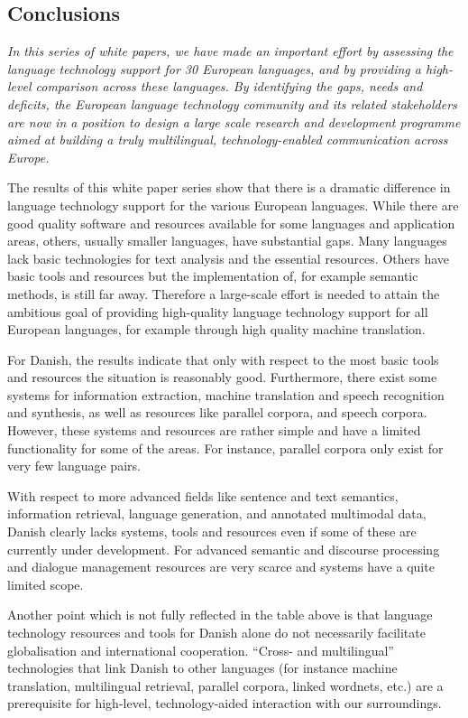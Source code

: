 \documentclass[]{../../metanetpaper}
\begin{document}
\begin{multicols}{2}
\subsection{Conclusions}

\emph{In this series of white papers, we have made an important effort by assessing the language technology support for 30 European languages, and by providing a high-level comparison across these languages. By identifying the gaps, needs and deficits, the European language technology community and its related stakeholders are now in a position to design a large scale research and development programme aimed at building a truly multilingual, technology-enabled communication across Europe.}

The results of this white paper series show that there is a dramatic difference in language technology support for the various European languages. While there are good quality software and resources available for some languages and application areas, others, usually smaller languages, have substantial gaps. Many languages lack basic technologies for text analysis and the essential resources. Others have basic tools and resources but the implementation of, for example semantic methods, is still far away. Therefore a large-scale effort is needed to attain the ambitious goal of providing high-quality language technology support for all European languages, for example through high quality machine translation. 

For Danish, the results indicate that only with respect to the most basic tools and resources the situation is reasonably good. Furthermore, there exist some systems for information extraction, machine translation and speech recognition and synthesis, as well as resources like parallel corpora, and speech corpora. However, these systems and resources are rather simple and have a limited functionality for some of the areas. For instance, parallel corpora only exist for very few language pairs.

With respect to more advanced fields like sentence and text semantics, information retrieval, language generation, and annotated multimodal data, Danish clearly lacks systems, tools and resources even if some of these are currently under development. For advanced semantic and discourse processing and  dialogue management resources are very scarce and systems have a quite limited scope.

Another point which is not fully reflected in the table above is that language technology resources and tools for Danish alone do not necessarily facilitate globalisation and international cooperation. ``Cross- and multilingual'' technologies that link Danish to other languages (for instance machine translation, multilingual retrieval, parallel corpora, linked wordnets, etc.) are a prerequisite for high-level, technology-aided interaction with our surroundings. 


\end{multicols}
\end{document}
